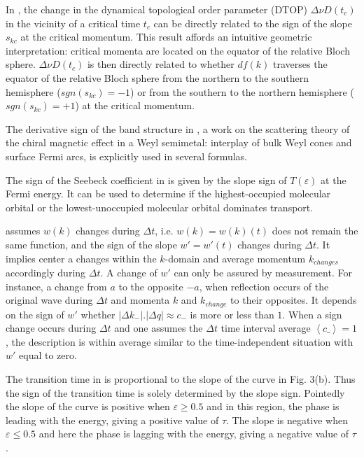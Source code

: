 \documentclass[11pt]{book}
\begin{document}
In \cite{budich2016dynamical}, the change in the dynamical topological order
parameter (DTOP) $\Delta\nu D\left(t_{c}\right)$
in the vicinity of a critical time $t_{c}$ can be directly related
to the sign of the slope $s_{kc}$ at the critical momentum. This
result affords an intuitive geometric interpretation: critical momenta
are located on the equator of the relative Bloch sphere. $\Delta\nu D\left(t_{c}\right)$
is then directly related to whether $df\left(k\right)$ traverses
the equator of the relative Bloch sphere from the northern to the
southern hemisphere ($sgn\left(s_{kc}\right)=-1$) or from the southern
to the northern hemisphere ($sgn\left(s_{kc}\right)=+1$) at the critical
momentum.

The derivative sign of the band structure in \cite{baireuther2016scattering}, a work on the scattering theory of the chiral magnetic effect in a Weyl semimetal:
interplay of bulk Weyl cones and surface Fermi arcs,
is explicitly used in several formulas.

The sign of the Seebeck coefficient in \cite{gehring2019single} is
given by the slope sign of $T\left(\varepsilon\right)$ at the Fermi
energy. It can be used to determine if the highest-occupied molecular orbital or the lowest-unoccupied molecular orbital dominates
transport.

\cite{hollestelle2021some} assumes $w\left(k\right)$ changes during
$\Delta t$, i.e. $w\left(k\right)=w\left(k\right)\left(t\right)$
does not remain the same function, and the sign of the slope $w'=w'\left(t\right)$
changes during $\Delta t$. It implies center a changes within the
$k$-domain and average momentum $k_{changes}$ accordingly during
$\Delta t$. A change of $w'$ can only be assured by measurement.
For instance, a change from $a$ to the opposite $-a$, when reflection
occurs of the original wave during $\Delta t$ and momenta $k$ and
$k_{change}$ to their opposites. It depends on the sign of $w'$
whether $\left|\Delta k_{-}\right|.\left|\Delta q\right|\approx c_{-}$
is more or less than $1$. When a sign change occurs during $\Delta t$
and one assumes the $\Delta t$ time interval average $\left\langle c\text{\_}\right\rangle =1$,
the description is within average similar to the time-independent
situation with $w'$ equal to zero.

The transition time in \cite{vashistha2021transition} is proportional
to the slope of the curve in Fig. 3(b). Thus the sign of the transition
time is solely determined by the slope sign. Pointedly the slope of
the curve is positive when $\varepsilon\geq0.5$ and in this region,
the phase is leading with the energy, giving a positive value of $\tau$.
The slope is negative when $\varepsilon\leq0.5$ and here the phase
is lagging with the energy, giving a negative value of $\tau$.
\end{document}
